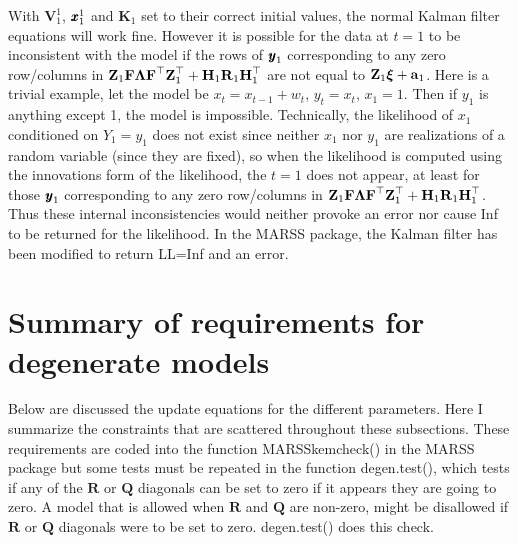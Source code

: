 \documentclass[]{article}
\def\xixi{\mbox{\boldmath $\xi$}}
\def\LAM{\mbox{\boldmath $\Lambda$}}
\def\XI{\mbox{\boldmath $\Xi$}}
\def\FF{\mbox{$\mathbf F$}} \def\ff{\mbox{$\mathbf f$}}
\def\HH{\mbox{$\mathbf H$}}	\def\hh{\mbox{$\mathbf h$}}
\def\KK{\mbox{$\mathbf K$}}
\def\QQ{\mbox{$\mathbf Q$}}	 \def\qq{\mbox{$\mathbf q$}} \def\Qb{\mbox{$\mathbf G$}}  \def\Qm{\mathbb{Q}}
\def\RR{\mbox{$\mathbf R$}}	 \def\rr{\mbox{$\mathbf r$}} \def\Rb{\mbox{$\mathbf H$}}	\def\Rm{\mathbb{R}}
\def\VV{\mbox{$\mathbf V$}}	\def\vv{\mbox{$\mathbf v$}}
\def\ZZ{\mbox{$\mathbf Z$}}	\def\zz{\mbox{$\mathbf z$}}	\def\Zb{\mbox{$\mathbf M$}} \def\Za{\mbox{$\mathbf N$}} \def\Zm{\XI}
\begin{document}
With $\VV_1^1$, $\mbox{$\pmb{x}$}_1^1$ and $\KK_1$ set to their correct initial values, the normal Kalman filter equations will work fine.  However it is possible for the data at $t=1$ to be inconsistent with the model if the rows of $\mbox{$\pmb{y}$}_1$ corresponding to any zero row/columns in $\ZZ_1\FF\LAM\FF^\top\ZZ_1^\top+\HH_1\RR_1\HH_1^\top$ are not equal to $\ZZ_1\xixi + \aa_1$.  Here is a trivial example, let the model be $x_t=x_{t-1}+w_t$, $y_t=x_t$, $x_1=1$.  Then if $y_1$ is anything except 1, the model is impossible.  Technically, the likelihood of $x_1$ conditioned on $Y_1=y_1$ does not exist since neither $x_1$ nor $y_1$ are realizations of a random variable (since they are fixed), so when the likelihood is computed using the innovations form of the likelihood, the $t=1$ does not appear, at least for those $\mbox{$\pmb{y}$}_1$ corresponding to any zero row/columns in $\ZZ_1\FF\LAM\FF^\top\ZZ_1^\top+\HH_1\RR_1\HH_1^\top$.  Thus these internal inconsistencies would neither provoke an error nor cause Inf to be returned for the likelihood.  In the MARSS package, the Kalman filter has been modified to return LL=Inf and an error.

\section{Summary of requirements for degenerate models}
Below are discussed the update equations for the different parameters.  Here I summarize the constraints that are scattered throughout these subsections.  These requirements are coded into the function MARSSkemcheck() in the MARSS package but some tests must be repeated in the function degen.test(), which tests if any of the $\RR$ or $\QQ$ diagonals can be set to zero if it appears they are going to zero.  A model that is allowed when $\RR$ and $\QQ$ are non-zero, might be disallowed if $\RR$ or $\QQ$ diagonals were to be set to zero.  degen.test() does this check.
\end{document}
